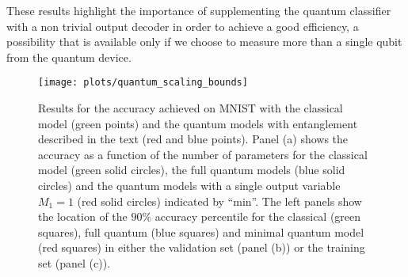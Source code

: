 These results highlight the importance of supplementing the quantum classifier with a non trivial output decoder in order to achieve a good efficiency, a possibility that is available only if we choose to measure more than a single qubit from the quantum device.

\begin{figure}
	\centering
	 \texttt{[image: plots/quantum\_scaling\_bounds]}
	\caption{ Results for the accuracy achieved on MNIST with the classical model (green points) and the quantum models with entanglement described in the text (red and blue points). Panel (a) shows the accuracy as a function of the number of parameters for the classical model (green solid circles), the full quantum models (blue solid circles) and the quantum models with a single output variable $M_1=1$ (red solid circles) indicated by ``min''. The left panels show the location of the $90\%$ accuracy percentile for the classical (green squares), full quantum (blue squares) and minimal quantum model (red squares) in either the validation set (panel (b)) or the training set (panel (c)).	\label{fig:qm_accuracy_bounds}}
\end{figure}
